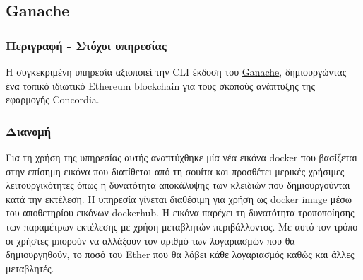 \subsection{Ganache} \label{subsection:4-3-6-ganache-service}

\subsubsection{Περιγραφή - Στόχοι υπηρεσίας}

Η συγκεκριμένη υπηρεσία αξιοποιεί την CLI έκδοση του \hyperref[subsection:4-2-3-2-ganache]{Ganache}, δημιουργώντας ένα τοπικό ιδιωτικό Ethereum blockchain για τους σκοπούς ανάπτυξης της εφαρμογής Concordia.

\subsubsection{Διανομή}

Για τη χρήση της υπηρεσίας αυτής αναπτύχθηκε μία νέα εικόνα docker που βασίζεται στην επίσημη εικόνα που διατίθεται από τη σουίτα και προσθέτει μερικές χρήσιμες λειτουργικότητες όπως η δυνατότητα αποκάλυψης των κλειδιών που δημιουργούνται κατά την εκτέλεση. Η υπηρεσία γίνεται διαθέσιμη για χρήση ως docker image μέσω του αποθετηρίου εικόνων dockerhub. Η εικόνα παρέχει τη δυνατότητα τροποποίησης των παραμέτρων εκτέλεσης με χρήση μεταβλητών περιβάλλοντος. Με αυτό τον τρόπο οι χρήστες μπορούν να αλλάξουν τον αριθμό των λογαριασμών που θα δημιουργηθούν, το ποσό του Ether που θα λάβει κάθε λογαριασμός καθώς και άλλες μεταβλητές.